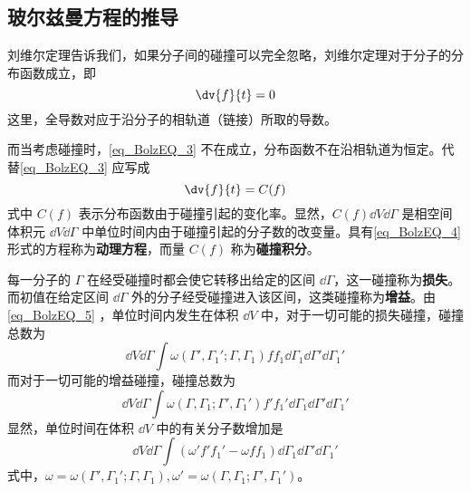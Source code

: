 \subsection{玻尔兹曼方程的推导}
 刘维尔定理告诉我们，如果分子间的碰撞可以完全忽略，刘维尔定理对于分子的分布函数成立，即
 \begin{equation}\label{eq_BolzEQ_3}
 \dv{f}{t}=0
 \end{equation}
 这里，全导数对应于沿分子的相轨道（链接）所取的导数。

 而当考虑碰撞时，\autoref{eq_BolzEQ_3} 不在成立，分布函数不在沿相轨道为恒定。代替\autoref{eq_BolzEQ_3} 应写成
 \begin{equation}\label{eq_BolzEQ_4}
 \dv{f}{t}=C(f)
 \end{equation}
 式中 $C(f)$ 表示分布函数由于碰撞引起的变化率。显然，$C(f)\dd V\dd\Gamma$ 是相空间体积元 $\dd V\dd\Gamma$ 中单位时间内由于碰撞引起的分子数的改变量。具有\autoref{eq_BolzEQ_4} 形式的方程称为\textbf{动理方程}，而量 $C(f)$ 称为\textbf{碰撞积分}。

 每一分子的 $\Gamma$ 在经受碰撞时都会使它转移出给定的区间 $\dd\Gamma$，这一碰撞称为\textbf{损失}。而初值在给定区间 $\dd \Gamma$ 外的分子经受碰撞进入该区间，这类碰撞称为\textbf{增益}。由\autoref{eq_BolzEQ_5} ，单位时间内发生在体积 $\dd V$ 中，对于一切可能的损失碰撞，碰撞总数为
 \begin{equation}
 \dd V\dd \Gamma\int\omega(\Gamma',\Gamma_1';\Gamma,\Gamma_1)ff_1\dd\Gamma_1\dd\Gamma'\dd\Gamma_1'
 \end{equation}
  而对于一切可能的增益碰撞，碰撞总数为
  \begin{equation}
  \dd V\dd \Gamma\int\omega(\Gamma,\Gamma_1;\Gamma',\Gamma_1')f'f_1'\dd\Gamma_1\dd\Gamma'\dd\Gamma_1'
  \end{equation}
  显然，单位时间在体积 $\dd V$ 中的有关分子数增加是
  \begin{equation}\label{eq_BolzEQ_6}
  \dd V\dd \Gamma\int(\omega'f'f_1'-\omega f f_1)\dd\Gamma_1\dd\Gamma'\dd\Gamma_1'
  \end{equation}
  式中，$\omega=\omega(\Gamma',\Gamma_1';\Gamma,\Gamma_1),\omega'=\omega(\Gamma,\Gamma_1;\Gamma',\Gamma_1')$。

